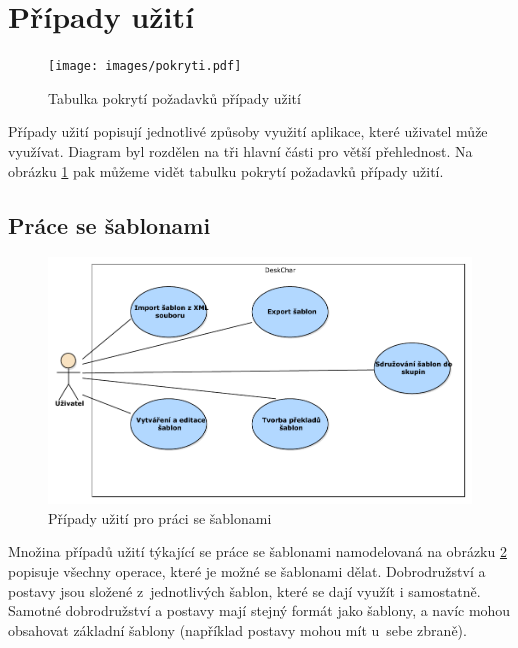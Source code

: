 \documentclass[thesis=B,czech]{resources/FITthesis}[2012/06/26]
\begin{document}
	\section{Případy užití}	
	\label{part:usecase}
	\begin{figure}\centering
		\texttt{[image: images/pokryti.pdf]}
		\caption[Tabulka pokrytí požadavků případy užití]{Tabulka pokrytí požadavků případy užití}
		\label{fig:pokryti}
	\end{figure}
Případy užití popisují jednotlivé způsoby využití aplikace, které uživatel může využívat. Diagram byl rozdělen na tři hlavní části pro větší přehlednost. Na obrázku \ref{fig:pokryti} pak můžeme vidět tabulku pokrytí požadavků případy užití.

\subsection{Práce se šablonami}
	\begin{figure}\centering
		\includegraphics[width=1\textwidth]{images/usecase-sablony.pdf}
		\caption[Případy užití pro šablony]{Případy užití pro práci se šablonami}			\label{fig:uc_sablony}
	\end{figure}

Množina případů užití týkající se práce se šablonami namodelovaná na obrázku \ref{fig:uc_sablony} popisuje všechny operace, které je možné se šablonami dělat. Dobrodružství a postavy jsou složené z~jednotlivých šablon, které se dají využít i samostatně. Samotné dobrodružství a postavy mají stejný formát jako šablony, a navíc mohou obsahovat základní šablony (například postavy mohou mít u~sebe zbraně).
\end{document}
